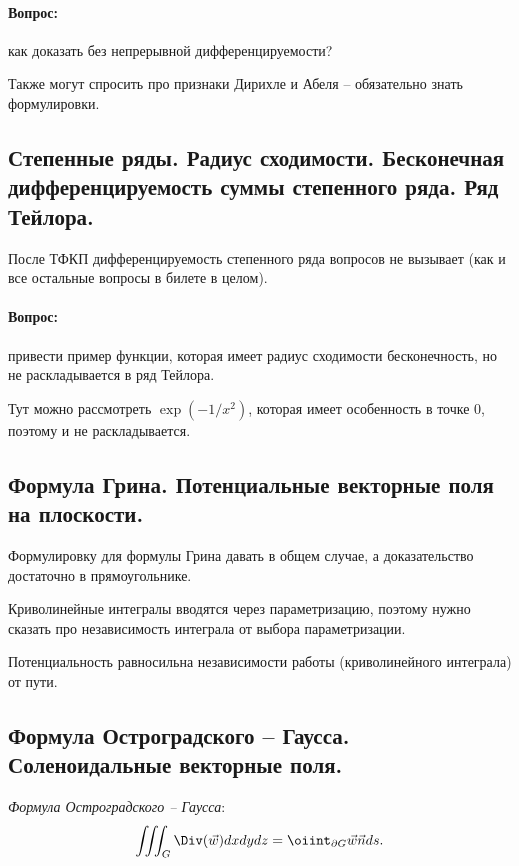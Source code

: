 \paragraph*{Вопрос:} как доказать без непрерывной дифференцируемости?

Также могут спросить про признаки Дирихле и Абеля -- обязательно знать формулировки.

\subsection{Степенные ряды. Радиус сходимости. Бесконечная дифференцируемость суммы степенного ряда. Ряд Тейлора.}

После ТФКП дифференцируемость степенного ряда вопросов не вызывает (как и все остальные вопросы в билете в целом).

\paragraph*{Вопрос:} привести пример функции, которая имеет радиус сходимости бесконечность, но не раскладывается в ряд Тейлора. 

Тут можно рассмотреть $\exp(-1/x^2)$, которая имеет особенность в точке 0, поэтому и не раскладывается. 

\subsection{Формула Грина. Потенциальные векторные поля на плоскости.}

Формулировку для формулы Грина давать в общем случае, а доказательство достаточно в прямоугольнике.

Криволинейные интегралы вводятся через параметризацию, поэтому нужно сказать про независимость интеграла от выбора параметризации. 

Потенциальность равносильна независимости работы (криволинейного интеграла) от пути.

\subsection{Формула Остроградского -- Гаусса. Соленоидальные векторные поля.}

\textit{Формула Остроградского -- Гаусса}:
\begin{equation*}
    \iiint_G \Div (\vec{w}) dxdydz = \oiint_{\partial G} \vec{w}\vec{n} ds.
\end{equation*}

